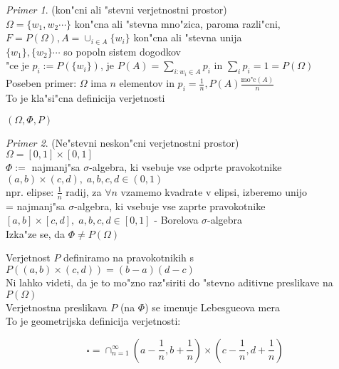 \documentclass[a4paper,12pt]{article}
\theoremstyle{definition}
\theoremstyle{remark}
\newtheorem*{ex}{Primer}
\begin{document}
\begin{ex}
    (kon"cni ali "stevni verjetnostni prostor) \\
    $\Omega = \{w_1, w_2 \cdots\}$ kon"cna ali "stevna mno"zica, paroma razli"cni, \\
    $F = P(\Omega), A = \cup_{i \in A} \{w_i\}$ kon"cna ali "stevna unija \\
    $\{w_1\}, \{w_2\} \cdots$ so popoln sistem dogodkov \\
    "ce je $p_i := P(\{w_i\})$, je $P(A) = \sum_{i: w_i \in A} p_i$ in $\sum_i p_i = 1 = P(\Omega)$ \\
    Poseben primer: $\Omega$ ima $n$ elementov in $p_i = \frac{1}{n}, P(A) \frac{\text{mo"c}(A)}{n}$ \\
    To je kla"si"cna definicija verjetnosti
\end{ex}




$(\Omega, \Phi, P)$

\begin{ex}
    (Ne"stevni neskon"cni verjetnostni prostor) \\
    $\Omega = [0,1] \times [0,1]$ \\
    $\Phi :=$ najmanj"sa $\sigma$-algebra, ki vsebuje vse odprte pravokotnike $(a,b) \times (c,d),
    \; a,b,c,d \in (0,1)$ \\
    npr. elipse: $\frac{1}{n}$ radij, za $\forall n$ vzamemo kvadrate v elipsi, izberemo unijo \\
    = najmanj"sa $\sigma$-algebra, ki vsebuje vse zaprte pravokotnike $[a,b] \times [c,d], \; a,b,c,d \in [0,1]$ -
    Borelova $\sigma$-algebra \\
    Izka"ze se, da $\Phi \neq P(\Omega)$
\end{ex}

Verjetnost $P$ definiramo na pravokotnikih s $P((a,b) \times (c,d)) = (b-a) (d-c)$ \\
Ni lahko videti, da je to mo"zno raz"siriti do "stevno aditivne preslikave na $P(\Omega)$ \\
Verjetnostna preslikava $P$ (na $\Phi$) se imenuje Lebesgueova mera \\
To je geometrijska definicija verjetnosti:

\begin{equation*}
    \square = \cap_{n=1}^{\infty} (a-\frac{1}{n}, b+\frac{1}{n}) \times (c-\frac{1}{n}, d+\frac{1}{n})
\end{equation*}
\end{document}
